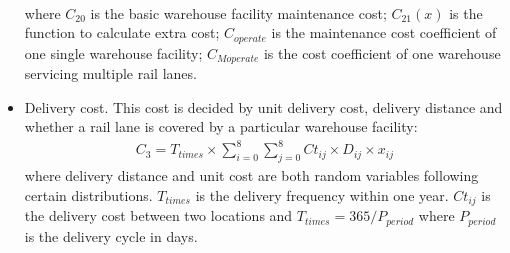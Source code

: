 \begin{itemize}
\begin{align}
	\end{align}
	where $C_{20}$ is the basic warehouse facility maintenance cost;
	$C_{21}(x)$ is the function to calculate extra cost;
	$C_{operate}$ is the maintenance cost coefficient of one single warehouse facility;
	$C_{Moperate}$ is the cost coefficient of one warehouse servicing multiple rail lanes.
	\item Delivery cost. This cost is decided by unit delivery cost, delivery distance and whether a rail lane is covered by a particular warehouse facility:
	\begin{align}
		C_3 = T_{times} \times \sum_{i = 0}^8 \sum_{j = 0}^8 Ct_{ij} \times D_{ij} \times x_{ij}
	\end{align}
	where delivery distance and unit cost are both random variables following certain distributions.
	$T_{times}$ is the delivery frequency within one year.
	$Ct_{ij}$ is the delivery cost between two locations and $T_{times} = 365 / P_{period}$ where $P_{period}$ is the delivery cycle in days.
\end{itemize}

